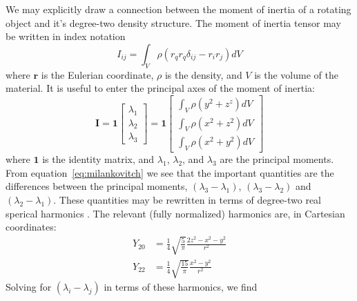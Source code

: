 \documentclass[extra,mreferee]{gji}
\newif\ifdetail
\begin{document}
We may explicitly draw a connection between the moment of inertia of a rotating object and it's degree-two density structure.  The moment of inertia tensor may be written in index notation
\begin{equation}
I_{ij} = \int_V \rho \left( r_q r_q \delta_{ij} - r_i r_j \right) dV
\label{eq:inertia}
\end{equation}
where $\mathbf{r}$ is the Eulerian coordinate, $\rho$ is the density, and $V$ is the volume of the material.  
It is useful to enter the principal axes of the moment of inertia:
\begin{equation}
\mathbf{I} = \mathbf{1} \begin{bmatrix}
\lambda_1 \\ \lambda_2 \\ \lambda_3
\end{bmatrix} = 
\mathbf{1} \begin{bmatrix}
\int_V \rho (y^2+z^z) dV\\
\int_V \rho (x^2+z^2) dV\\
\int_V \rho (x^2+y^2) dV
\end{bmatrix}
\end{equation}
where $\mathbf{1}$ is the identity matrix, and $\lambda_1$, $\lambda_2$, and $\lambda_3$ are the principal moments.
From equation~\eqref{eq:milankovitch} we see that the important quantities are the differences between the 
principal moments, $(\lambda_3-\lambda_1)$, $(\lambda_3-\lambda_2)$ and $(\lambda_2-\lambda_1)$.
These quantities may be rewritten in terms of degree-two real sperical harmonics \citep[e.g.][]{dahlen1999theoretical}.
The relevant (fully normalized) harmonics are, in Cartesian coordinates:
\begin{equation}
\begin{aligned}
Y_{20} &= \frac{1}{4} \sqrt{\frac{ 5}{\pi}} \frac{ 2 z^2 - x^2 - y^2}{r^2} \\ 
Y_{22} &= \frac{1}{4} \sqrt{\frac{15}{\pi}} \frac{ x^2 - y^2}{r^2}
\end{aligned}
\end{equation}
Solving for $( \lambda_i - \lambda_j )$ in terms of these harmonics, we find
\ifdetail
\end{document}
